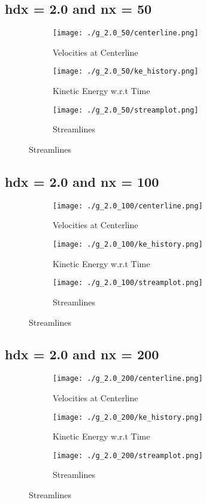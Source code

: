 \documentclass[12pt, a4paper]{report}
\begin{document}
\subsection{hdx = 2.0 and nx = 50}
\begin{figure}[H]
\begin{subfigure}{0.5\textwidth}
	\texttt{[image: ./g\_2.0\_50/centerline.png]}
	\caption{Velocities at Centerline}
\end{subfigure}
\begin{subfigure}{0.5\textwidth}
	\texttt{[image: ./g\_2.0\_50/ke\_history.png]}
	\caption{Kinetic Energy w.r.t Time}
\end{subfigure}
\medskip
\begin{subfigure}{\textwidth}
	\centering
	\texttt{[image: ./g\_2.0\_50/streamplot.png]}
	\caption{Streamlines}
\end{subfigure}
\end{figure}

\subsection{hdx = 2.0 and nx = 100}
\begin{figure}[H]
\begin{subfigure}{0.5\textwidth}
	\texttt{[image: ./g\_2.0\_100/centerline.png]}
	\caption{Velocities at Centerline}
\end{subfigure}
\begin{subfigure}{0.5\textwidth}
	\texttt{[image: ./g\_2.0\_100/ke\_history.png]}
	\caption{Kinetic Energy w.r.t Time}
\end{subfigure}
\medskip
\begin{subfigure}{\textwidth}
	\texttt{[image: ./g\_2.0\_100/streamplot.png]}
	\caption{Streamlines}
\end{subfigure}
\end{figure}

\subsection{hdx = 2.0 and nx = 200}
\begin{figure}[H]
\begin{subfigure}{0.5\textwidth}
	\texttt{[image: ./g\_2.0\_200/centerline.png]}
	\caption{Velocities at Centerline}
\end{subfigure}
\begin{subfigure}{0.5\textwidth}
	\texttt{[image: ./g\_2.0\_200/ke\_history.png]}
	\caption{Kinetic Energy w.r.t Time}
\end{subfigure}
\medskip
\begin{subfigure}{\textwidth}
	\texttt{[image: ./g\_2.0\_200/streamplot.png]}
	\caption{Streamlines}
\end{subfigure}
\end{figure}
\end{document}
